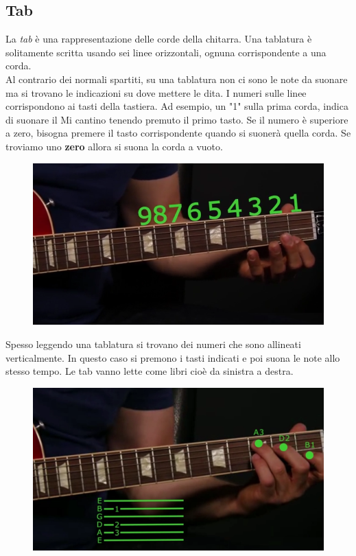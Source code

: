 \subsection{Tab}
La \textit{tab} è una rappresentazione delle corde della chitarra. Una tablatura è solitamente scritta usando sei linee orizzontali, ognuna corrispondente a una corda.\\
Al contrario dei normali spartiti, su una tablatura non ci sono le note da suonare ma si trovano le indicazioni su dove mettere le dita. I numeri sulle linee corrispondono ai tasti della tastiera. Ad esempio, un "1" sulla prima corda, indica di suonare il Mi cantino tenendo premuto il primo tasto.
Se il numero è superiore a zero, bisogna premere il tasto corrispondente quando si suonerà quella corda. Se troviamo uno \textbf{zero} allora si suona la corda a vuoto.
\begin{figure}[H]
	\centering
	\includegraphics[scale=0.50]{./images/img15.png}
\end{figure}

Spesso leggendo una tablatura si trovano dei numeri che sono allineati verticalmente. In questo caso si premono i tasti indicati e poi suona le note allo stesso tempo. Le tab vanno lette come libri cioè da sinistra a destra.
\begin{figure}[H]
	\centering
	\includegraphics[scale=0.50]{./images/img16.png}
\end{figure}